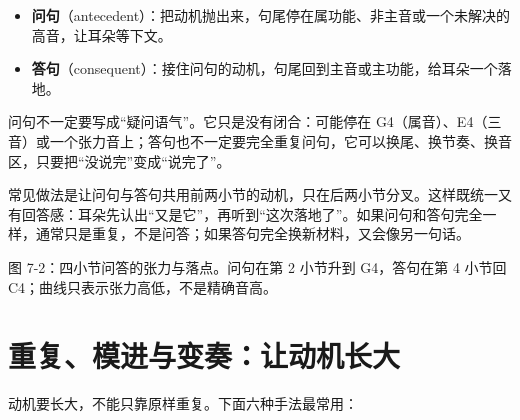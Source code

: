 \begin{itemize}
  \item \textbf{问句}（antecedent）：把动机抛出来，句尾停在属功能、非主音或一个未解决的高音，让耳朵等下文。
  \item \textbf{答句}（consequent）：接住问句的动机，句尾回到主音或主功能，给耳朵一个落地。
\end{itemize}

问句不一定要写成“疑问语气”。它只是没有闭合：可能停在 G4（属音）、E4（三音）或一个张力音上；答句也不一定要完全重复问句，它可以换尾、换节奏、换音区，只要把“没说完”变成“说完了”。

常见做法是让问句与答句共用前两小节的动机，只在后两小节分叉。这样既统一又有回答感：耳朵先认出“又是它”，再听到“这次落地了”。如果问句和答句完全一样，通常只是重复，不是问答；如果答句完全换新材料，又会像另一句话。


\begin{center}
\begin{minipage}{0.92\linewidth}
\centering
{}

图 7-2：四小节问答的张力与落点。问句在第 2 小节升到 G4，答句在第 4 小节回 C4；曲线只表示张力高低，不是精确音高。
\end{minipage}
\end{center}

\section{重复、模进与变奏：让动机长大}

动机要长大，不能只靠原样重复。下面六种手法最常用：


